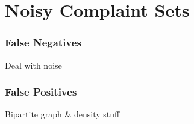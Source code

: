 \section{Noisy Complaint Sets}
\label{sec:noise}

\subsubsection{False Negatives}
Deal with noise

\subsubsection{False Positives}
Bipartite graph \& density stuff
